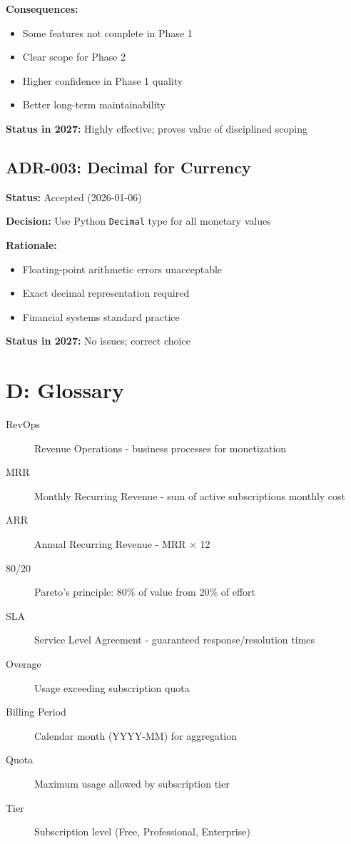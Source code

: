 \documentclass[12pt]{report}
\begin{document}
\textbf{Consequences:}
\begin{itemize}
    \item Some features not complete in Phase 1
    \item Clear scope for Phase 2
    \item Higher confidence in Phase 1 quality
    \item Better long-term maintainability
\end{itemize}

\textbf{Status in 2027:} Highly effective; proves value of disciplined scoping

\section{ADR-003: Decimal for Currency}

\textbf{Status:} Accepted (2026-01-06)

\textbf{Decision:} Use Python \lstinline{Decimal} type for all monetary values

\textbf{Rationale:}
\begin{itemize}
    \item Floating-point arithmetic errors unacceptable
    \item Exact decimal representation required
    \item Financial systems standard practice
\end{itemize}

\textbf{Status in 2027:} No issues; correct choice

\chapter{D: Glossary}

\begin{description}
    \item[RevOps] Revenue Operations - business processes for monetization
    \item[MRR] Monthly Recurring Revenue - sum of active subscriptions monthly cost
    \item[ARR] Annual Recurring Revenue - MRR × 12
    \item[80/20] Pareto's principle: 80\% of value from 20\% of effort
    \item[SLA] Service Level Agreement - guaranteed response/resolution times
    \item[Overage] Usage exceeding subscription quota
    \item[Billing Period] Calendar month (YYYY-MM) for aggregation
    \item[Quota] Maximum usage allowed by subscription tier
    \item[Tier] Subscription level (Free, Professional, Enterprise)
\end{description}
\end{document}
